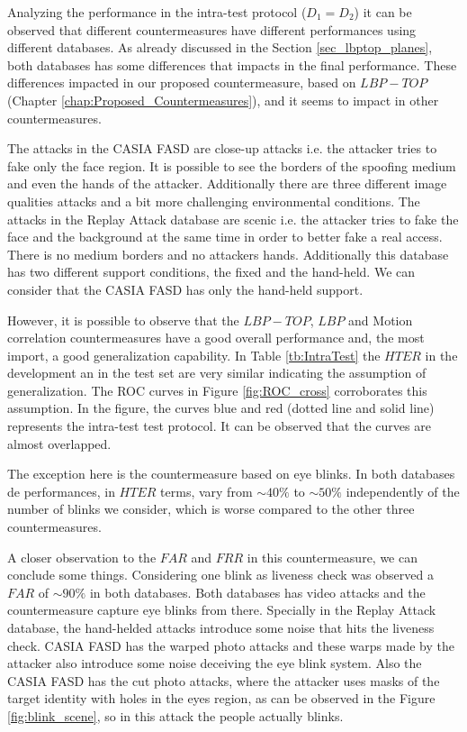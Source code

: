 Analyzing the performance in the intra-test protocol ($D_1 = D_2$) it can be observed that different countermeasures have different performances using different databases. As already discussed in the Section \ref{sec_lbptop_planes}, both databases has some differences that impacts in the final performance. These differences impacted in our proposed countermeasure, based on $LBP-TOP$ (Chapter \ref{chap:Proposed_Countermeasures}), and it seems to impact in other countermeasures.

The attacks in the CASIA FASD are close-up attacks i.e. the attacker tries to fake only the face region. It is possible to see the borders of the spoofing medium and even the hands of the attacker. Additionally there are three different image qualities attacks and a bit more challenging environmental conditions. The attacks in the Replay Attack database are scenic i.e. the attacker tries to fake the face and the background at the same time in order to better fake a real access. There is no medium borders and no attackers hands. Additionally this database has two different support conditions, the fixed and the hand-held. We can consider that the CASIA FASD has only the hand-held support.

However, it is possible to observe that the $LBP-TOP$, $LBP$ and Motion correlation countermeasures have a good overall performance and, the most import, a good generalization capability. In Table \ref{tb:IntraTest} the $HTER$ in the development an in the test set are very similar indicating the assumption of generalization. The ROC curves in Figure \ref{fig:ROC_cross} corroborates this assumption. In the figure, the curves blue and red (dotted line and solid line) represents the intra-test test protocol. It can be observed that the curves are almost overlapped.

The exception here is the countermeasure based on eye blinks. In both databases de performances, in $HTER$ terms, vary from $\sim40\%$ to $\sim50\%$ independently of the number of blinks we consider, which is worse compared to the other three countermeasures.

A closer observation to the $FAR$ and $FRR$ in this countermeasure, we can conclude some things.  Considering one blink as liveness check was observed a $FAR$ of $\sim 90\%$ in both databases. Both databases has video attacks and the countermeasure capture eye blinks from there. Specially in the Replay Attack database, the hand-helded attacks introduce some noise that hits the liveness check. CASIA FASD has the warped photo attacks and these warps made by the attacker also introduce some noise deceiving the eye blink system. Also the CASIA FASD has the cut photo attacks, where the attacker uses masks of the target identity with holes in the eyes region, as can be observed in the Figure \ref{fig:blink_scene}, so in this attack the people actually blinks. 

